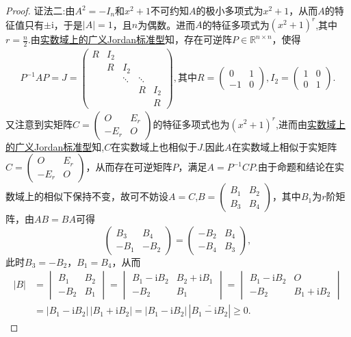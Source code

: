 \documentclass[../../main.tex]{subfiles}%
\begin{document}
\begin{proof}
{\color{blue} 证法二:}由\(A^2 = -I_n\)和\(x^2 + 1\)不可约知\(A\)的极小多项式为\(x^2 + 1\)，从而\(A\)的特征值只有\(\pm \mathrm{i}\)，于是\(|A| = 1\)，且\(n\)为偶数。进而\(A\)的特征多项式为\((x^2 + 1)^r\),其中$r=\frac{n}{2}$.由\hyperref[theorem:实数域上的广义Jordan标准型]{实数域上的广义Jordan标准型}知，存在可逆阵\(P \in \mathbb{R}^{n \times n}\)，使得
\begin{align*}
P^{-1}AP = J = \begin{pmatrix}
R & I_2 &  &  &  \\
 & R & I_2 &  &  \\
 &  & \ddots & \ddots &  \\
 &  &  & R & I_2 \\
 &  &  &  & R
\end{pmatrix},\text{其中}R = \begin{pmatrix} 0 & 1 \\ -1 & 0 \end{pmatrix},I_2 = \begin{pmatrix} 1 & 0 \\ 0 & 1 \end{pmatrix}.
\end{align*}
又注意到实矩阵$C = \begin{pmatrix} O & E_r \\ -E_r & O \end{pmatrix}$的特征多项式也为\((x^2 + 1)^r\),进而由\hyperref[theorem:实数域上的广义Jordan标准型]{实数域上的广义Jordan标准型}知,$C$在实数域上也相似于$J$.因此$A$在实数域上相似于实矩阵$C = \begin{pmatrix} O & E_r \\ -E_r & O \end{pmatrix}$，从而存在可逆矩阵$P$，满足$A = P^{-1}CP$.由于命题和结论在实数域上的相似下保持不变，故可不妨设$A=C$,$B = \begin{pmatrix} B_1 & B_2 \\ B_3 & B_4 \end{pmatrix}$，其中$B_1$为$r$阶矩阵，由$AB=BA$可得
$$
\begin{pmatrix} B_3 & B_4 \\ -B_1 & -B_2 \end{pmatrix} = \begin{pmatrix} -B_2 & B_4 \\ -B_4 & B_3 \end{pmatrix},
$$
此时$B_3 = -B_2$，$B_1 = B_4$，从而
\begin{align*}
|B| & = \begin{vmatrix} B_1 & B_2 \\ -B_2 & B_1 \end{vmatrix} = \begin{vmatrix} B_1 - \text{i}B_2 & B_2 + \text{i}B_1 \\ -B_2 & B_1 \end{vmatrix} = \begin{vmatrix} B_1 -  \text{i}B_2 & O \\ -B_2 & B_1 + \text{i}B_2 \end{vmatrix} \\
&= |B_1 - \text{i}B_2| \, |B_1 +  \text{i}B_2| = |B_1 - \text{i}B_2| \, |\overline{B_1 -  \text{i}B_2}| \geqslant 0.
\end{align*}


\end{proof}
\end{document}
